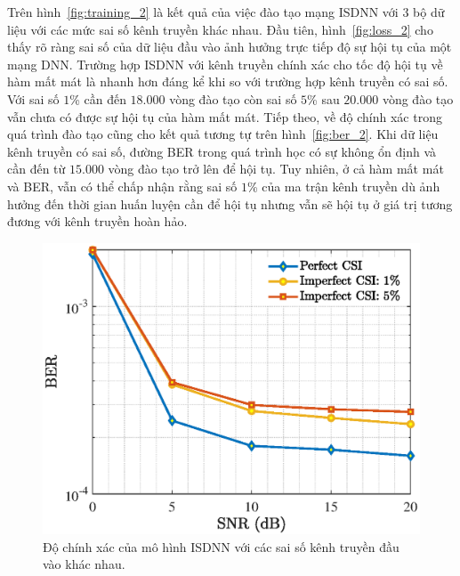 Trên hình~\ref{fig:training_2} là kết quả của việc đào tạo mạng ISDNN với $3$ bộ dữ liệu với các mức sai số kênh truyền khác nhau. Đầu tiên, hình~\ref{fig:loss_2} cho thấy rõ ràng sai số của dữ liệu đầu vào ảnh hưởng trực tiếp độ sự hội tụ của một mạng DNN. Trường hợp ISDNN với kênh truyền chính xác cho tốc độ hội tụ về hàm mất mát là nhanh hơn đáng kể khi so với trường hợp kênh truyền có sai số. Với sai số $1$\% cần đến $18.000$ vòng đào tạo còn sai số $5$\% sau $20.000$ vòng đào tạo vẫn chưa có được sự hội tụ của hàm mất mát. Tiếp theo, về độ chính xác trong quá trình đào tạo cũng cho kết quả tương tự trên hình~\ref{fig:ber_2}. Khi dữ liệu kênh truyền có sai số, đường BER trong quá trình học có sự không ổn định và cần đến từ $15.000$ vòng đào tạo trở lên để hội tụ. Tuy nhiên, ở cả hàm mất mát và BER, vẫn có thể chấp nhận rằng sai số $1$\% của ma trận kênh truyền dù ảnh hưởng đến thời gian huấn luyện cần để hội tụ nhưng vẫn sẽ hội tụ ở giá trị tương đương với kênh truyền hoàn hảo.
\begin{figure}[ht]
    \centering
    \includegraphics[width=\linewidth]{figures/performance_2.eps}
    \caption{Độ chính xác của mô hình ISDNN với các sai số kênh truyền đầu vào khác nhau.}
    \label{fig:isdnn_1}
\end{figure}

